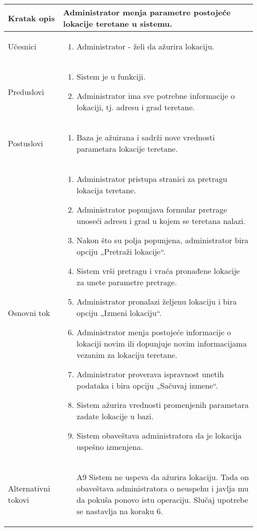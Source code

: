 \documentclass[../main.tex]{subfiles}
\begin{document}
\begin{longtable}{| p{} | p{} |} 

\hline
    Kratak opis &  Administrator menja parametre postojeće lokacije teretane u sistemu.\\ 
\hline    
    Učesnici & 
    	\begin{enumerate}
        \item Administrator - želi da ažurira lokaciju.
     \end{enumerate}\\
\hline
   Preduslovi & \begin{enumerate}
       \item Sistem je u funkciji.
       \item Administrator ima sve potrebne informacije o lokaciji, tj. adresu i grad teretane.
   \end{enumerate}\\
\hline  
    Postuslovi & \begin{enumerate}
        \item Baza je ažuirana i sadrži nove vrednosti parametara lokacije teretane.
    \end{enumerate}\\
\hline
    Osnovni tok & \begin{enumerate}
        \item Administrator pristupa stranici za pretragu lokacija teretane.
        \item Administrator popunjava formular pretrage unoseći adresu i grad u kojem se teretana nalazi.
        \item Nakon što su polja popunjena, administrator bira opciju „Pretraži lokacije“.
        \item Sistem vrši pretragu i vraća pronađene lokacije za unete parametre pretrage.
        \item Administrator pronalazi željenu lokaciju i bira opciju „Izmeni lokaciju“.
        \item Administrator menja postojeće informacije o lokaciji novim ili dopunjuje novim informacijama vezanim za lokaciju teretane.
        \item Administrator proverava ispravnost unetih podataka i bira opciju „Sačuvaj izmene“.
        \item Sistem ažurira vrednosti promenjenih parametara zadate lokacije u bazi.
        \item Sistem obaveštava administratora da je lokacija uspešno izmenjena.
    \end{enumerate}\\
\hline
    Alternativni tokovi & \begin{itemize}
        \item[A9]  Sistem ne uspeva da ažurira lokaciju. Tada on obaveštava administratora o neuspehu i javlja mu da pokuša ponovo istu operaciju. Slučaj upotrebe se nastavlja na koraku 6.


\end{itemize}
\end{longtable}
\end{document}
